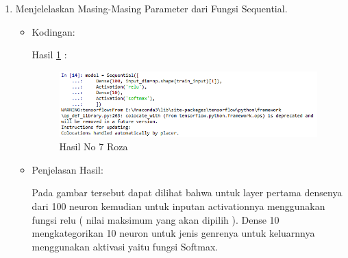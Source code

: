\begin{enumerate}
\item Menjelelaskan Masing-Masing Parameter dari Fungsi Sequential.
\begin{itemize}
\item Kodingan:

\par Hasil \ref{no7roza} :
\begin{figure}[!hbtp]
\centering
\includegraphics[scale=0.7]{figures/no7roza.png}
\caption{Hasil No 7 Roza}
\label{no7roza}
\end{figure}
\item Penjelasan Hasil:
\par Pada gambar tersebut dapat dilihat bahwa untuk layer pertama densenya dari 100 neuron kemudian untuk inputan activationnya menggunakan fungsi relu ( nilai maksimum yang akan dipilih ). Dense 10 mengkategorikan 10 neuron untuk jenis genrenya untuk keluarnnya menggunakan aktivasi yaitu fungsi Softmax.
\end{itemize}
\par


\end{enumerate}
